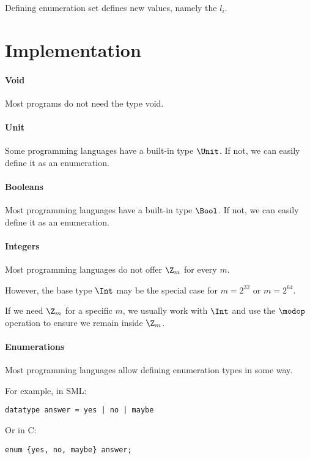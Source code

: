 Defining enumeration set defines new values, namely the $l_i$.

\section{Implementation}

\paragraph{Void}
Most programs do not need the type void.

\paragraph{Unit}
Some programming languages have a built-in type $\Unit$.
If not, we can easily define it as an enumeration.

\paragraph{Booleans}
Most programming languages have a built-in type $\Bool$.
If not, we can easily define it as an enumeration.

\paragraph{Integers}
Most programming languages do not offer $\Z_m$ for every $m$.

However, the base type $\Int$ may be the special case for $m=2^{32}$ or $m=2^{64}$.

If we need $\Z_m$ for a specific $m$, we usually work with $\Int$ and use the $\modop$ operation to ensure we remain inside $\Z_m$.

\paragraph{Enumerations}
Most programming languages allow defining enumeration types in some way.

For example, in SML:

\begin{lstlisting}
datatype answer = yes | no | maybe
\end{lstlisting}

Or in C:

\begin{lstlisting}
enum {yes, no, maybe} answer;
\end{lstlisting}